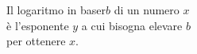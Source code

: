 \documentclass[preview]{standalone}
\begin{document}
\begin{center}
Il logaritmo in baser$b$ di un numero $x$\\è l'esponente $y$ a cui bisogna elevare $b$\\per ottenere $x$.
\end{center}
\end{document}
